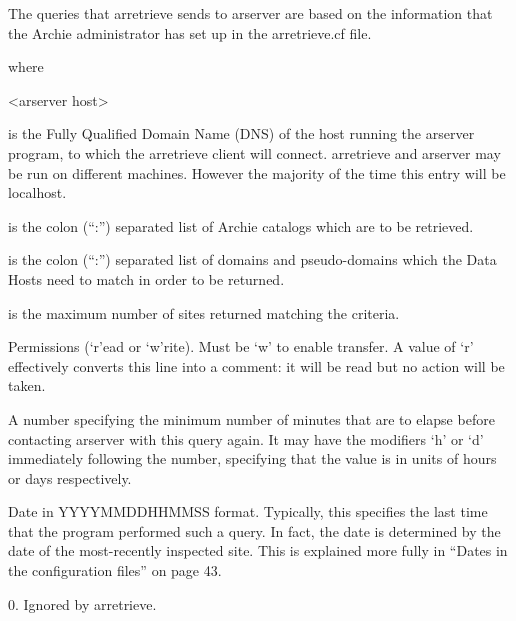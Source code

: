 The queries that arretrieve sends to arserver are based on the information that the Archie administrator has set up in the arretrieve.cf file. 




where

\begin{TTentry}{<arserver host>}

\item[<arserver host>]
is the Fully Qualified Domain Name (DNS) of the host running the arserver program, to which the arretrieve client will connect. arretrieve and arserver may be run on different machines. However the majority of the time this entry will be localhost.

\item[<db list>]
is the colon (``:'') separated list of Archie catalogs which are to be retrieved.

\item[<domain list>]
is the colon (``:'') separated list of domains and pseudo-domains which the Data Hosts need to match in order to be returned. 

\item[<max no>]
is the maximum number of sites returned matching the criteria.

\item[<perms>]
Permissions (`r'ead or `w'rite). Must be `w' to enable transfer. A value of `r' effectively converts this line into a comment: it will be read but no action will be taken.

\item[<freq>]
A number specifying the minimum number of minutes that are to elapse before contacting arserver with this query again. It may have the modifiers `h' or `d' immediately following the number, specifying that the value is in units of hours or days respectively.

\item[<date>]
Date in YYYYMMDDHHMMSS format. Typically, this specifies the last time that the program performed such a query. In fact, the date is determined by the date of the most-recently inspected site. This is explained more fully in ``Dates in the configuration files'' on page 43.

\item[<fail>]
0. Ignored by arretrieve.
\end{TTentry}

